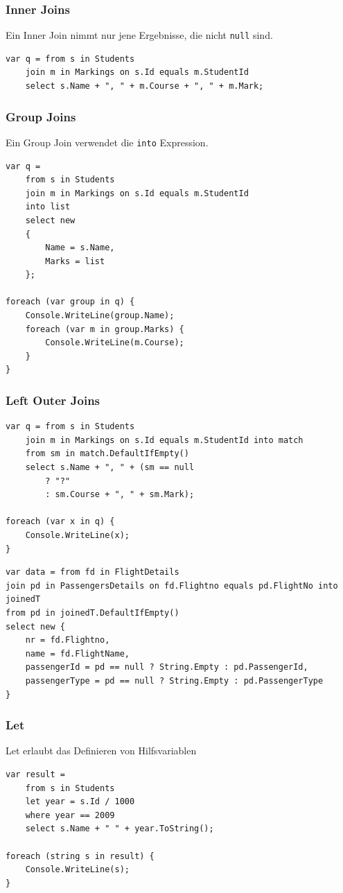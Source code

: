 \documentclass[
a4paper,
oneside,
10pt,
fleqn,
headsepline,
toc=listofnumbered, 
bibliography=totocnumbered]{scrartcl}
\begin{document}
\clearpage

\subsubsection{Inner Joins}
Ein Inner Join nimmt nur jene Ergebnisse, die nicht \lstinline|null| sind.
\begin{lstlisting}
var q = from s in Students
	join m in Markings on s.Id equals m.StudentId
	select s.Name + ", " + m.Course + ", " + m.Mark;
\end{lstlisting}

\subsubsection{Group Joins}
Ein Group Join verwendet die \lstinline|into| Expression.
\begin{lstlisting}
var q =
	from s in Students
	join m in Markings on s.Id equals m.StudentId
	into list
	select new
	{
		Name = s.Name,
		Marks = list
	};
	
foreach (var group in q) {
	Console.WriteLine(group.Name);
	foreach (var m in group.Marks) {
		Console.WriteLine(m.Course);
	}
}
\end{lstlisting}

\subsubsection{Left Outer Joins}
\begin{lstlisting}
var q = from s in Students
	join m in Markings on s.Id equals m.StudentId into match
	from sm in match.DefaultIfEmpty()
	select s.Name + ", " + (sm == null
		? "?"
		: sm.Course + ", " + sm.Mark);
		
foreach (var x in q) {
	Console.WriteLine(x);
}
\end{lstlisting}

\begin{lstlisting}
var data = from fd in FlightDetails
join pd in PassengersDetails on fd.Flightno equals pd.FlightNo into joinedT
from pd in joinedT.DefaultIfEmpty()
select new {
	nr = fd.Flightno,
	name = fd.FlightName,
	passengerId = pd == null ? String.Empty : pd.PassengerId,
	passengerType = pd == null ? String.Empty : pd.PassengerType
}
\end{lstlisting}

\clearpage

\subsubsection{Let}
Let erlaubt das Definieren von Hilfsvariablen
\begin{lstlisting}
var result =
	from s in Students
	let year = s.Id / 1000
	where year == 2009
	select s.Name + " " + year.ToString();

foreach (string s in result) {
	Console.WriteLine(s);
}
\end{lstlisting}
\end{document}
